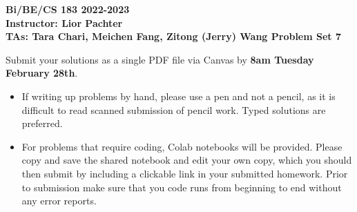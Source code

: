 \documentclass[11pt]{exam}
\begin{document}
\begin{center}

     \textbf{Bi/BE/CS 183 2022-2023\\ Instructor: Lior Pachter\\ TAs: Tara Chari, Meichen Fang, Zitong (Jerry) Wang \vskip 0.15in Problem Set 7}

\end{center}
Submit your solutions as a single PDF file via Canvas by {\bf 8am Tuesday February 28th}. 
\begin{itemize}
  \item If writing up problems by hand, please use a pen and not a pencil, as it is difficult to read scanned submission of pencil work. Typed solutions are preferred.
  \item For problems that require coding, Colab notebooks will be provided. Please copy and save the shared notebook and edit your own copy, which you should then submit by including a clickable link in your submitted homework. Prior to submission make sure that you code runs from beginning to end without any error reports.
  \end{itemize}
  
  
  
\end{document}
